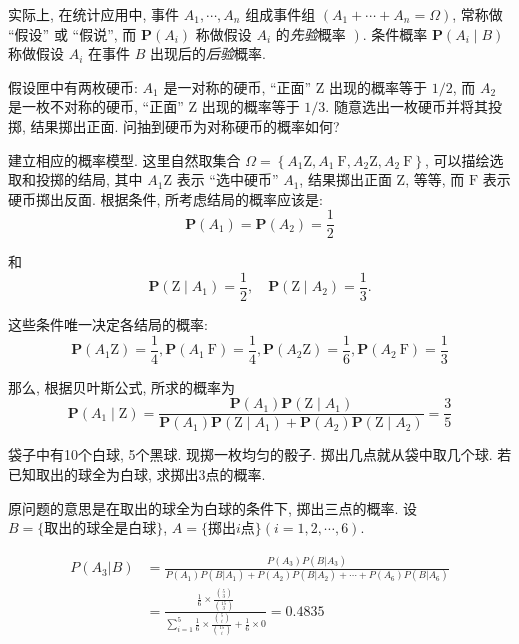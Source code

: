     实际上, 在统计应用中, 事件 $A_1, \cdots, A_n$ 组成事件组 $\left(A_1+\cdots+A_n=\Omega\right)$, 常称做 “假设” 或 “假说”, 而 $\mathbf{P}\left(A_i\right)$ 称做假设 $A_i$ 的\emph{先验}概率 $\left.\right)$. 条件概率 $\mathbf{P}\left(A_i \mid B\right)$ 称做假设 $A_i$ 在事件 $B$ 出现后的\emph{后验}概率. 


\begin{exercise}
    假设匣中有两枚硬币: $A_1$ 是一对称的硬币, “正面” $\mathrm{Z}$ 出现的概率等于 $1 / 2$, 而 $A_2$ 是一枚不对称的硬币, “正面” $\mathrm{Z}$ 出现的概率等于 $1 / 3$. 随意选出一枚硬币并将其投掷, 结果掷出正面. 问抽到硬币为对称硬币的概率如何?
\end{exercise}

\begin{solution}
    建立相应的概率模型. 这里自然取集合 $\Omega=\left\{A_1 \mathrm{Z}, A_1 \mathrm{~F}, A_2 \mathrm{Z}, A_2 \mathrm{~F}\right\}$, 可以描绘选取和投掷的结局, 其中 $A_1 \mathrm{Z}$ 表示 “选中硬币” $A_1$, 结果掷出正面 $\mathrm{Z}$, 等等, 而 $\mathrm{F}$ 表示硬币掷出反面. 根据条件, 所考虑结局的概率应该是:
$$
\mathbf{P}\left(A_1\right)=\mathbf{P}\left(A_2\right)=\frac{1}{2}
$$

和
$$
\mathbf{P}\left(\mathrm{Z} \mid A_1\right)=\frac{1}{2}, \quad \mathbf{P}\left(\mathrm{Z} \mid A_2\right)=\frac{1}{3} .
$$

这些条件唯一决定各结局的概率:
$$
\mathbf{P}\left(A_1 \mathrm{Z}\right)=\frac{1}{4}, \mathbf{P}\left(A_1 \mathrm{~F}\right)=\frac{1}{4}, \mathbf{P}\left(A_2 \mathrm{Z}\right)=\frac{1}{6}, \mathbf{P}\left(A_2 \mathrm{~F}\right)=\frac{1}{3}
$$

那么, 根据贝叶斯公式, 所求的概率为
$$
\mathbf{P}\left(A_1 \mid \mathrm{Z}\right)=\frac{\mathbf{P}\left(A_1\right) \mathbf{P}\left(\mathrm{Z} \mid A_1\right)}{\mathbf{P}\left(A_1\right) \mathbf{P}\left(\mathrm{Z} \mid A_1\right)+\mathbf{P}\left(A_2\right) \mathbf{P}\left(\mathrm{Z} \mid A_2\right)}=\frac{3}{5}
$$
\end{solution}

\begin{exercise}
    袋子中有10个白球, 5个黑球. 现掷一枚均匀的骰子. 掷出几点就从袋中取几个球. 若已知取出的球全为白球, 求掷出3点的概率. 
\end{exercise}

\begin{solution}
    原问题的意思是在取出的球全为白球的条件下, 掷出三点的概率. 设$B=\{\text{取出的球全是白球}\}$, $A=\{\text{掷出}i\text{点}\}(i=1,2,\cdots, 6)$.

    \begin{align*}
        P(A_3 | B) &= \frac{P(A_3)P(B|A_3)}{P(A_1)P(B|A_1)+P(A_2)P(B|A_2)+\cdots+P(A_6)P(B|A_6)} \\
        &= \frac{\frac16 \times \frac{\binom 53}{\binom {15}3}}{\sum_{i=1}^5 \frac16\times \frac{\binom 5i}{\binom{15}i}+\frac16\times 0}=0.4835
    \end{align*}
\end{solution}